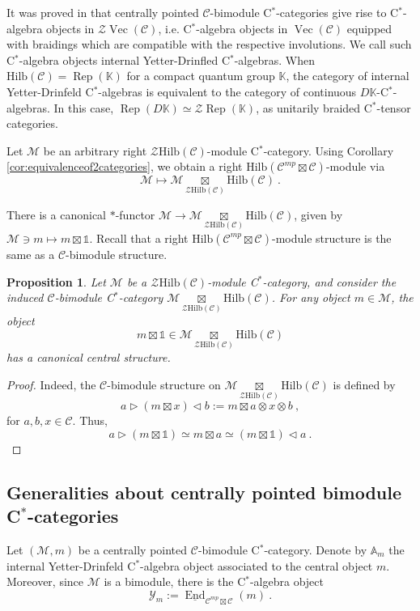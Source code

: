 \documentclass[a4paper,11pt,reqno]{amsart}
\numberwithin{equation}{section}
\newtheorem{proposition}[theorem]{Proposition}
\theoremstyle{remark}
\theoremstyle{definition}
\newcommand{\bA}{\mathbb A}
\newcommand{\bK}{\mathbb K}
\newcommand{\cC}{\mathcal C}
\newcommand{\cM}{\mathcal M}
\newcommand{\cY}{\mathcal Y}
\newcommand{\cZ}{\mathcal Z}
\DeclareMathOperator{\End}{End}
\DeclareMathOperator{\Rep}{Rep}
\DeclareMathOperator{\Vect}{Vec}
\newcommand\un{{\mathds 1}}
\newcommand{\Hilb}{\mathrm{Hilb}}
\begin{document}
It was proved in \cite{hataishi2025categorical} that centrally pointed $\cC$-bimodule C$^*$-categories give rise to C$^*$-algebra objects in $\cZ \Vect(\cC)$, i.e. C$^*$-algebra objects in $\Vect(\cC)$ equipped with braidings which are compatible with the respective involutions. We call such C$^*$-algebra objects internal Yetter-Drinfled C$^*$-algebras. When $\Hilb (\cC) = \Rep(\bK)$ for a compact quantum group $\bK$, the category of internal Yetter-Drinfeld C$^*$-algebras is equivalent to the category of continuous $D\bK$-C$^*$-algebras. In this case, $\Rep (D\bK) \simeq \cZ \Rep(\bK)$, as unitarily braided C$^*$-tensor categories.
\bigskip

Let $\cM$ be an arbitrary right $\cZ \Hilb(\cC)$-module C$^*$-category. Using Corollary \ref{cor:equivalenceof2categories}, we obtain a right $\Hilb(\cC^{mp} \boxtimes \cC)$-module via
\[
\cM \mapsto \cM \underset{\cZ \Hilb(\cC)}{\boxtimes} \Hilb(\cC) \ .
\]

There is a canonical $*$-functor $\cM \to \cM \underset{\cZ \Hilb(\cC)}{\boxtimes} \Hilb(\cC)$, given by $\cM \ni m \mapsto m \boxtimes \un$. Recall that a right $\Hilb(\cC^{mp} \boxtimes \cC)$-module structure is the same as a $\cC$-bimodule structure.

\begin{proposition}
	Let $\cM$ be a $\cZ \Hilb(\cC)$-module C$^*$-category, and consider the induced $\cC$-bimodule C$^*$-category $\cM \underset{\cZ \Hilb(\cC)}{\boxtimes} \Hilb(\cC)$. For any object $m \in \cM$, the object 
	\[m \boxtimes \un \in \cM \underset{\cZ \Hilb(\cC)}{\boxtimes} \Hilb(\cC)
	\]
	has a canonical central structure.
	\label{prop:frommodulerforthecentertocentrallypointedbimodules}
\end{proposition}
\begin{proof}
	Indeed, the $\cC$-bimodule structure on $\cM \underset{\cZ \Hilb(\cC)}{\boxtimes} \Hilb(\cC)$ is defined by
	\[ a \triangleright (m \boxtimes x) \triangleleft b := m \boxtimes a \otimes x \otimes b \ ,\]
	for $a,b,x \in \cC$. Thus,
	\[
	a \triangleright (m \boxtimes \un) \simeq m \boxtimes a \simeq (m \boxtimes \un) \triangleleft a \ . 
	\]
\end{proof}


\subsection{Generalities about centrally pointed bimodule C$^*$-categories}

Let $(\cM,m)$ be a centrally pointed $\cC$-bimodule C$^*$-category. Denote by $\bA_m$ the internal Yetter-Drinfeld C$^*$-algebra object associated to the central object $m$. Moreover, since $\cM$ is a bimodule, there is the C$^*$-algebra object
\[
\cY_m := \underline{\End}_{\cC^{mp} \boxtimes \cC}(m) \ .
\]
\end{document}
